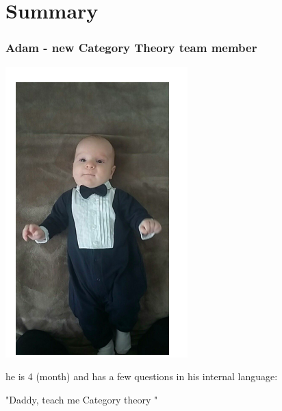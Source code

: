 \documentclass{beamer}
\theoremstyle{definition}
\theoremstyle{remark}
\begin{document}
\section{Summary}
%
\frame
{
\frametitle{Adam - new Category Theory team member}  
\begin{center}
\includegraphics[scale=0.4]{adas1.png}
\end{center}
he is 4 (month) and has a few questions in his internal language:
\begin{center}
"Daddy,  teach me  Category theory " 
\end{center}
}
\end{document}
